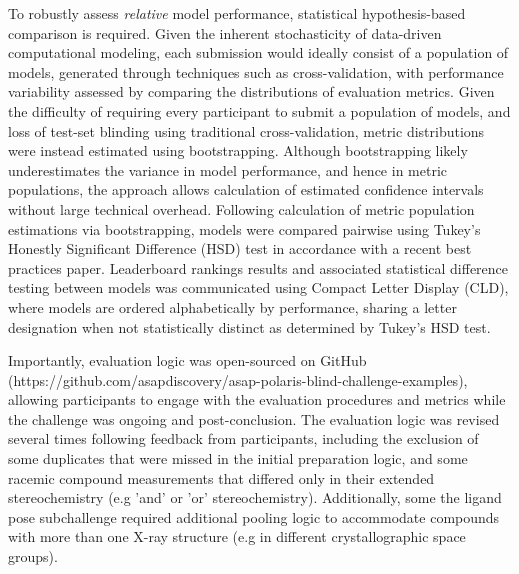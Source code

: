 \documentclass[journal=jcim,manuscript=article]{achemso}
\begin{document}
To robustly assess \textit{relative} model performance, statistical hypothesis-based comparison is required\cite{ash_practically_2024}. Given the inherent stochasticity of data-driven computational modeling, each submission would ideally consist of a population of models, generated through techniques such as cross-validation, with performance variability assessed by comparing the distributions of evaluation metrics. Given the difficulty of requiring every participant to submit a population of models, and loss of test-set blinding using traditional cross-validation, metric distributions were instead estimated using bootstrapping\cite{efron_bootstrap_1979}. Although bootstrapping likely underestimates the variance in model performance, and hence in metric populations, the approach allows calculation of estimated confidence intervals without large technical overhead. Following calculation of metric population estimations via bootstrapping, models were compared pairwise using Tukey's Honestly Significant Difference (HSD) test in accordance with a recent best practices paper\cite{ash_practically_2024}. Leaderboard rankings results and associated statistical difference testing between models was communicated using Compact Letter Display (CLD)\cite{cld_algorithm_2004}, where models are ordered alphabetically by performance, sharing a letter designation when not statistically distinct as determined by Tukey's HSD test. 

Importantly, evaluation logic was open-sourced on GitHub (https://github.com/asapdiscovery/asap-polaris-blind-challenge-examples), allowing participants to engage with the evaluation procedures and metrics while the challenge was ongoing and post-conclusion. The evaluation logic was revised several times following feedback from participants, including the exclusion of some duplicates that were missed in the initial preparation logic, and some racemic compound measurements that differed only in their extended stereochemistry (e.g 'and' or 'or' stereochemistry). Additionally, some the ligand pose subchallenge required additional pooling logic to accommodate compounds with more than one X-ray structure (e.g in different crystallographic space groups). 
\end{document}
